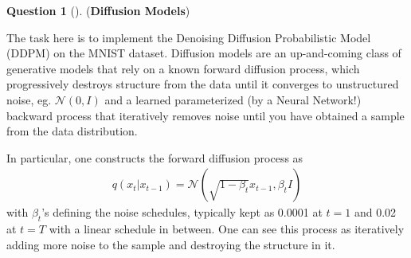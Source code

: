 \documentclass[12pt]{article}
\theoremstyle{definition}
\newtheorem{exercise}{Question}%
\begin{document}
\begin{exercise}[] (\textbf{Diffusion Models}) 

The task here is to implement the Denoising Diffusion Probabilistic Model (DDPM) on the MNIST dataset. Diffusion models are an up-and-coming class of generative models that rely on a known forward diffusion process, which progressively destroys structure from the data until it converges to unstructured noise, eg. $\mathcal{N}(0, I)$ and a learned parameterized (by a Neural Network!) backward process that iteratively removes noise until you have obtained a sample from the data distribution.

In particular, one constructs the forward diffusion process as
\begin{align*}
    q(x_t | x_{t-1}) = \mathcal{N}(\sqrt{1-\beta_t} x_{t-1}, \beta_t I)
\end{align*}
with $\beta_t$'s defining the noise schedules, typically kept as 0.0001 at $t=1$ and 0.02 at $t=T$ with a linear schedule in between. One can see this process as iteratively adding more noise to the sample and destroying the structure in it.


\end{exercise}
\end{document}
